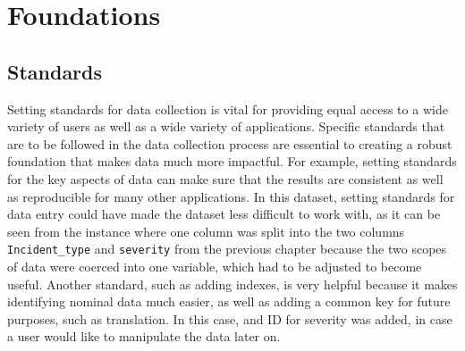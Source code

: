 \documentclass[
]{book}
\newenvironment{Shaded}{\begin{snugshade}}{\end{snugshade}}
\newcommand{\DataTypeTok}[1]{\textcolor[rgb]{0.13,0.29,0.53}{#1}}
\newcommand{\DecValTok}[1]{\textcolor[rgb]{0.00,0.00,0.81}{#1}}
\newcommand{\KeywordTok}[1]{\textcolor[rgb]{0.13,0.29,0.53}{\textbf{#1}}}
\newcommand{\NormalTok}[1]{#1}
\newcommand{\OperatorTok}[1]{\textcolor[rgb]{0.81,0.36,0.00}{\textbf{#1}}}
\newcommand{\StringTok}[1]{\textcolor[rgb]{0.31,0.60,0.02}{#1}}
\begin{document}
\hypertarget{foundations}{%
\chapter{Foundations}\label{foundations}}

\hypertarget{standards}{%
\section{Standards}\label{standards}}

Setting standards for data collection is vital for providing equal access to a wide variety of users as well as a wide variety of applications. Specific standards that are to be followed in the data collection process are essential to creating a robust foundation that makes data much more impactful. For example, setting standards for the key aspects of data can make sure that the results are consistent as well as reproducible for many other applications. In this dataset, setting standards for data entry could have made the dataset less difficult to work with, as it can be seen from the instance where one column was split into the two columns \texttt{Incident\_type} and \texttt{severity} from the previous chapter because the two scopes of data were coerced into one variable, which had to be adjusted to become useful. Another standard, such as adding indexes, is very helpful because it makes identifying nominal data much easier, as well as adding a common key for future purposes, such as translation. In this case, and ID for severity was added, in case a user would like to manipulate the data later on.

\begin{Shaded}
\end{Shaded}
\end{document}
